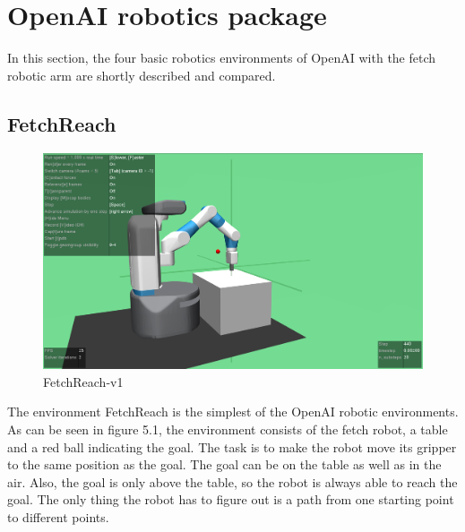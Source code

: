 








\section{OpenAI robotics package}

In this section, the four basic robotics environments of OpenAI with the fetch robotic arm are shortly described and compared.

\subsection{FetchReach}

\begin{figure} [h]
	
	\centering
	\includegraphics[width=1\textwidth]{figures/FetchReach-v1.png}
	\caption{FetchReach-v1}
	
\end{figure} 

The environment FetchReach is the simplest of the OpenAI robotic environments. As can be seen in figure 5.1, the environment consists of the fetch robot, a table and a red ball indicating the goal. The task is to make the robot move its gripper to the same position as the goal. The goal can be on the table as well as in the air. Also, the goal is only above the table, so the robot is always able to reach the goal. The only thing the robot has to figure out is a path from one starting point to different points.

